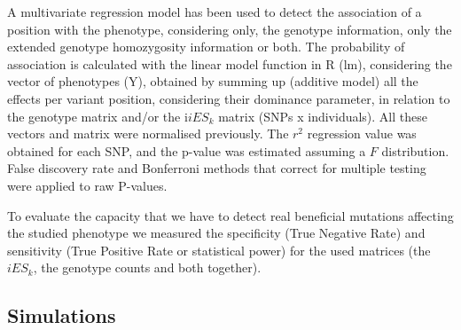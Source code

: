 \documentclass[a4paper,11pt]{article}
\begin{document}

A  multivariate regression model has been used to detect the association of a position with the phenotype, considering only, the genotype information, only the extended genotype homozygosity information or both. The probability of association is calculated with the linear model function in R (lm), considering the vector of phenotypes (Y), obtained by summing up (additive model) all the effects per variant position, considering their dominance parameter, in relation to the genotype matrix and/or the i${iES_k}$ matrix  (SNPs x individuals). All these vectors and matrix were normalised previously. The $r^2$ regression value was obtained for each SNP, and the p-value was estimated assuming a $F$ distribution. False discovery rate and Bonferroni methods \citep{Benjamini:1995aa} that correct for multiple testing were applied to raw P-values. \par
To evaluate the capacity that we have to detect real beneficial mutations affecting the studied phenotype we measured the specificity (True Negative Rate) and sensitivity (True Positive Rate or statistical power) for the used matrices (the $iES_k$, the genotype counts and both together). %


\subsection{Simulations}

\end{document}
